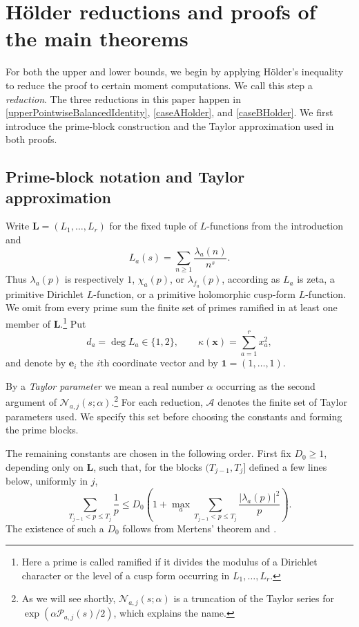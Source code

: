 \documentclass[oneside, 12pt]{amsart}
\theoremstyle{definition}
\begin{document}
	{
		\section{Hölder reductions and proofs of the main theorems}\label{holderReductionsSection}
		
		For both the upper and lower bounds, we begin by applying
		Hölder's inequality to reduce the proof to certain moment computations.
		We call this step a \emph{reduction}.  The three reductions in this
		paper happen in \eqref{upperPointwiseBalancedIdentity},
		\eqref{caseAHolder}, and \eqref{caseBHolder}.
		We first introduce the prime-block construction and the Taylor
		approximation used in both proofs.
		
		\subsection{Prime-block notation and Taylor approximation}
		
		Write \(\boldsymbol L=(L_1,\ldots,L_r)\) for the fixed tuple of $L$-functions from the
		introduction and
		\[
		L_a(s)=\sum_{n\geq1}\frac{\lambda_a(n)}{n^s}.
		\]
		Thus \(\lambda_a(p)\) is respectively \(1\), \(\chi_a(p)\), or
		\(\lambda_{f_a}(p)\), according as \(L_a\) is zeta, a primitive
		Dirichlet \(L\)-function, or a primitive holomorphic cusp-form
		\(L\)-function.  We omit from every prime sum the finite set of primes
		ramified in at least one member of \(\boldsymbol L\).\footnote{
			Here a prime is called ramified if it divides the modulus
			of a Dirichlet character or the level of a cusp form
			occurring in $L_1,\ldots,L_r$.}  Put
		\[
		d_a=\deg L_a\in\{1,2\},\qquad
		\kappa(\boldsymbol x)=\sum_{a=1}^r x_a^2,
		\]
		and denote by \(\boldsymbol e_i\) the \(i\)th coordinate vector and by
		\(\boldsymbol 1=(1,\ldots,1)\).
		
		By a \emph{Taylor parameter} we mean a real number $\alpha$
		occurring as the second argument of
		$\mathcal N_{a,j}(s;\alpha)$.\footnote{As we will see shortly,
			$\mathcal N_{a,j}(s;\alpha)$ is a truncation of the Taylor series
			for $\exp(\alpha\mathcal P_{a,j}(s)/2)$, which explains the name.}
		For each reduction, $\mathscr A$ denotes the finite set of Taylor
		parameters used.  We specify this set before choosing the constants
		and forming the prime blocks.
		
		The remaining constants are chosen in the following order.
		First fix $D_0\geq1$, depending only on $\boldsymbol L$, such that,
		for the blocks $(T_{j-1},T_j]$ defined a few lines below, uniformly in $j$,
		\begin{equation}\label{unweightedVarianceComparison}
			\sum_{T_{j-1}<p\leq T_j}\frac1p
			\leq D_0\left(1+\max_a
			\sum_{T_{j-1}<p\leq T_j}\frac{|\lambda_a(p)|^2}{p}\right).
		\end{equation}
		The existence of such a $D_0$ follows from Mertens' theorem
		and .
		
}
\end{document}

